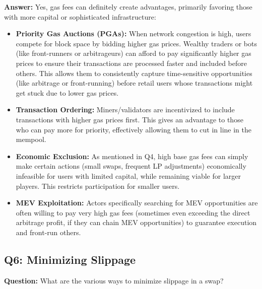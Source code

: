 \documentclass[12pt]{article}
\begin{document}
\textbf{Answer:} Yes, gas fees can definitely create advantages, primarily favoring those with more capital or sophisticated infrastructure:
\begin{itemize}
    \item \textbf{Priority Gas Auctions (PGAs):} When network congestion is high, users compete for block space by bidding higher gas prices. Wealthy traders or bots (like front-runners or arbitrageurs) can afford to pay significantly higher gas prices to ensure their transactions are processed faster and included before others. This allows them to consistently capture time-sensitive opportunities (like arbitrage or front-running) before retail users whose transactions might get stuck due to lower gas prices.
    \item \textbf{Transaction Ordering:} Miners/validators are incentivized to include transactions with higher gas prices first. This gives an advantage to those who can pay more for priority, effectively allowing them to cut in line in the mempool.
    \item \textbf{Economic Exclusion:} As mentioned in Q4, high base gas fees can simply make certain actions (small swaps, frequent LP adjustments) economically infeasible for users with limited capital, while remaining viable for larger players. This restricts participation for smaller users.
    \item \textbf{MEV Exploitation:} Actors specifically searching for MEV opportunities are often willing to pay very high gas fees (sometimes even exceeding the direct arbitrage profit, if they can chain MEV opportunities) to guarantee execution and front-run others.
\end{itemize}

\subsection{Q6: Minimizing Slippage}
\textbf{Question:} What are the various ways to minimize slippage in a swap?
\end{document}
